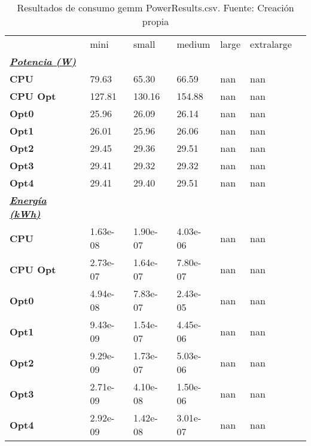 \begin{table}[H]
    \centering
    \begin{tabular}{lllllll}
    \rowcolor[HTML]{DAE8FC} \ & mini & small & medium & 	large & 	extralarge \\
    \cellcolor[HTML]{DAE8FC} \textbf{\textbf{{\emph{{\underline{{Potencia (W)}}}}}}} &  &  &  & 	 & 	 \\
    \rowcolor[HTML]{EFEFEF} \cellcolor[HTML]{DAE8FC} \textbf{CPU} & 79.63 & 65.30 & 66.59 & 	nan & 	nan \\
    \cellcolor[HTML]{DAE8FC} \textbf{CPU Opt} & 127.81 & 130.16 & 154.88 & 	nan & 	nan \\
    \rowcolor[HTML]{EFEFEF} \cellcolor[HTML]{DAE8FC} \textbf{Opt0} & 25.96 & 26.09 & 26.14 & 	nan & 	nan \\
    \cellcolor[HTML]{DAE8FC} \textbf{Opt1} & 26.01 & 25.96 & 26.06 & 	nan & 	nan \\
    \rowcolor[HTML]{EFEFEF} \cellcolor[HTML]{DAE8FC} \textbf{Opt2} & 29.45 & 29.36 & 29.51 & 	nan & 	nan \\
    \cellcolor[HTML]{DAE8FC} \textbf{Opt3} & 29.41 & 29.32 & 29.32 & 	nan & 	nan \\
    \rowcolor[HTML]{EFEFEF} \cellcolor[HTML]{DAE8FC} \textbf{Opt4} & 29.41 & 29.40 & 29.51 & 	nan & 	nan \\
    \cellcolor[HTML]{DAE8FC} \textbf{\textbf{{\emph{{\underline{{Energía (kWh)}}}}}}} &  &  &  & 	 & 	 \\
    \rowcolor[HTML]{EFEFEF} \cellcolor[HTML]{DAE8FC} \textbf{CPU} & 1.63e-08 & 1.90e-07 & 4.03e-06 & 	nan & 	nan \\
    \cellcolor[HTML]{DAE8FC} \textbf{CPU Opt} & 2.73e-07 & 1.64e-07 & 7.80e-07 & 	nan & 	nan \\
    \rowcolor[HTML]{EFEFEF} \cellcolor[HTML]{DAE8FC} \textbf{Opt0} & 4.94e-08 & 7.83e-07 & 2.43e-05 & 	nan & 	nan \\
    \cellcolor[HTML]{DAE8FC} \textbf{Opt1} & 9.43e-09 & 1.54e-07 & 4.45e-06 & 	nan & 	nan \\
    \rowcolor[HTML]{EFEFEF} \cellcolor[HTML]{DAE8FC} \textbf{Opt2} & 9.29e-09 & 1.73e-07 & 5.03e-06 & 	nan & 	nan \\
    \cellcolor[HTML]{DAE8FC} \textbf{Opt3} & 2.71e-09 & 4.10e-08 & 1.50e-06 & 	nan & 	nan \\
    \rowcolor[HTML]{EFEFEF} \cellcolor[HTML]{DAE8FC} \textbf{Opt4} & 2.92e-09 & 1.42e-08 & 3.01e-07 & 	nan & 	nan \\
    \end{tabular}
    \caption[Resultados de consumo gemm PowerResults.csv]{{Resultados de consumo gemm PowerResults.csv. Fuente: Creación propia}}
    \label{table_global_gemm_PowerResults_data}
\end{table}